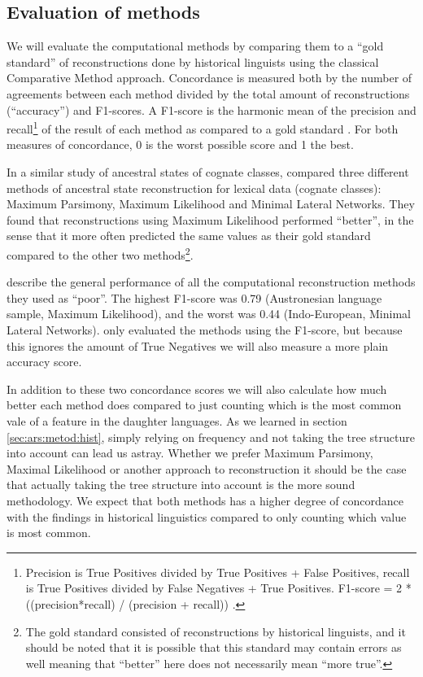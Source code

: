 \documentclass[draft,10pt]{article} %
\begin{document}
\subsection{Evaluation of methods}
We will evaluate the computational methods by comparing them to a ``gold standard'' of reconstructions done by historical linguists using the classical Comparative Method approach. Concordance is measured both by the number of agreements between each method divided by the total amount of reconstructions (``accuracy'') and F1-scores. A F1-score is the harmonic mean of the precision and recall\footnote{Precision is True Positives divided by True Positives + False Positives, recall is True Positives divided by False Negatives + True Positives. F1-score = 2 * ((precision*recall) / (precision + recall)) \citep{van1979information}.} of the result of each method as compared to a gold standard \citep[133]{van1979information}. For both measures of concordance, 0 is the worst possible score and 1 the best. 

In a similar study of ancestral states of cognate classes, \citet{jager2018using} compared three different methods of ancestral state reconstruction for lexical data (cognate classes): Maximum Parsimony, Maximum Likelihood and Minimal Lateral Networks. They found that reconstructions using Maximum Likelihood performed ``better'', in the sense that it more often predicted the same values as their gold standard compared to the other two methods\footnote{ The gold standard consisted of reconstructions by historical linguists, and it should be noted that it is possible that this standard may contain errors as well meaning that ``better'' here does not necessarily mean ``more true''.}. 

\citet{jager2018using} describe the general performance of all the computational reconstruction methods they used as ``poor''. The highest F1-score was 0.79 (Austronesian language sample, Maximum Likelihood), and the worst was 0.44 (Indo-European, Minimal Lateral Networks). \citet{jager2018using} only evaluated the methods using the F1-score, but because this ignores the amount of True Negatives we will also measure a more plain accuracy score. 

In addition to these two concordance scores we will also calculate how much better each method does compared to just counting which is the most common vale of a feature in the daughter languages. As we learned in section \ref{sec:ars:metod:hist}, simply relying on frequency and not taking the tree structure into account can lead us astray. Whether we prefer Maximum Parsimony, Maximal Likelihood or another approach to reconstruction it should be the case that actually taking the tree structure into account is the more sound methodology. We expect that both methods has a higher degree of concordance with the findings in historical linguistics compared to only counting which value is most common.
\end{document}
